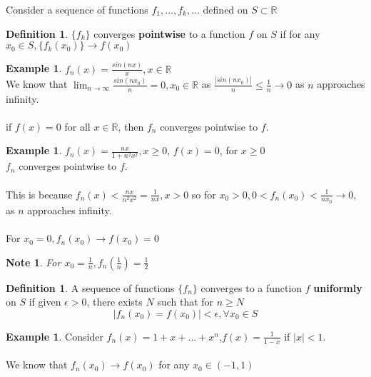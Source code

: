 \documentclass[12pt]{article}
\theoremstyle{plain}
\newtheorem*{note}{Note}
\theoremstyle{definition}
\newtheorem{definition}[theorem]{Definition}
\newtheorem{example}[theorem]{Example}
\begin{document}
Consider a sequence of functions $f_1, ... ,f_k, ...$ defined on $S \subset \mathbb{R}$\\

\begin{definition}
$\{ f_k \}$ converges \textbf{pointwise} to a function $f$ on $S$ if for any $x_0 \in S, \{ f_k (x_0) \} \to f(x_0)$

\end{definition}

\begin{example}
	$f_n (x) = \frac{sin(nx)}{x}, x\in\mathbb{R}$\\
	
	We know that $\lim_{n\to\infty} \frac{sin(n x_0)}{n} = 0, x_0 \in\mathbb{R}$ as
	$\frac{|sin(n x_0)|}{n} \leq \frac{1}{n} \to 0$ as $n$ approaches infinity.\\
	\\
	if $f(x) = 0$ for all $x\in\mathbb{R}$, then $f_n$ converges pointwise to $f$.
\end{example}

\begin{example}
	$f_n (x) = \frac{nx}{1 + n^2 x^2}, x \geq 0$, $f(x) = 0$, for $x \geq 0$
	\\
	$f_n$ converges pointwise to $f$.\\
	\\
	This is because $f_n (x) < \frac{nx}{n^2 x^2} = \frac{1}{nx}, x > 0$ so for $x_0 > 0, 0 < f_n (x_0) < \frac{1}{n x_0} \to 0$, as $n$ approaches infinity.\\
	\\
	For $x_0 = 0, f_n (x_0) \to f(x_0) = 0$
\end{example}

\begin{note}
	For $x_0 = \frac{1}{n}, f_n (\frac{1}{n}) = \frac{1}{2}$
\end{note}

\begin{definition}
	A sequence of functions $\{ f_n \}$ converges to a function $f$ \textbf{uniformly} on $S$ if given $\epsilon > 0$, there exists $N$ such that for $n \geq N$
	$$|f_n (x_0) = f(x_0)| < \epsilon, \forall x_0 \in S$$
\end{definition}

\begin{example}
	Consider $f_n (x) = 1+ x + ... + x^n$,$ f(x)=\frac{1}{1-x}$ if $|x| < 1$.\\
	\\
	We know that $f_n (x_0) \to f(x_0)$ for any $x_0 \in (-1, 1)$
\end{example}
\end{document}
